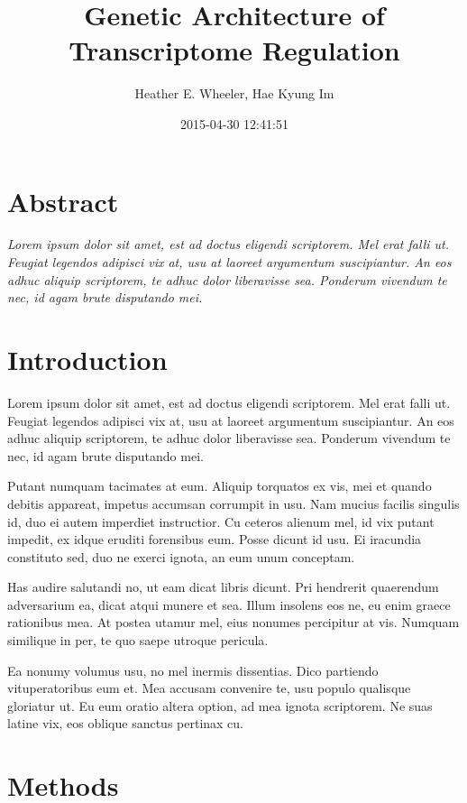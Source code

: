 \documentclass[]{article}
\title{Genetic Architecture of Transcriptome Regulation}
\author{Heather E. Wheeler, Hae Kyung Im}
\date{2015-04-30 12:41:51}
\begin{document}
\maketitle


\section{Abstract}\label{abstract}

\emph{Lorem ipsum dolor sit amet, est ad doctus eligendi scriptorem. Mel
erat falli ut. Feugiat legendos adipisci vix at, usu at laoreet
argumentum suscipiantur. An eos adhuc aliquip scriptorem, te adhuc dolor
liberavisse sea. Ponderum vivendum te nec, id agam brute disputando
mei.}

\section{Introduction}\label{introduction}

Lorem ipsum dolor sit amet, est ad doctus eligendi scriptorem. Mel erat
falli ut. Feugiat legendos adipisci vix at, usu at laoreet argumentum
suscipiantur. An eos adhuc aliquip scriptorem, te adhuc dolor
liberavisse sea. Ponderum vivendum te nec, id agam brute disputando mei.

Putant numquam tacimates at eum. Aliquip torquatos ex vis, mei et quando
debitis appareat, impetus accumsan corrumpit in usu. Nam mucius facilis
singulis id, duo ei autem imperdiet instructior. Cu ceteros alienum mel,
id vix putant impedit, ex idque eruditi forensibus eum. Posse dicunt id
usu. Ei iracundia constituto sed, duo ne exerci ignota, an eum unum
conceptam.

Has audire salutandi no, ut eam dicat libris dicunt. Pri hendrerit
quaerendum adversarium ea, dicat atqui munere et sea. Illum insolens eos
ne, eu enim graece rationibus mea. At postea utamur mel, eius nonumes
percipitur at vis. Numquam similique in per, te quo saepe utroque
pericula.

Ea nonumy volumus usu, no mel inermis dissentias. Dico partiendo
vituperatoribus eum et. Mea accusam convenire te, usu populo qualisque
gloriatur ut. Eu eum oratio altera option, ad mea ignota scriptorem. Ne
suas latine vix, eos oblique sanctus pertinax cu.

\section{Methods}\label{methods}
\end{document}
